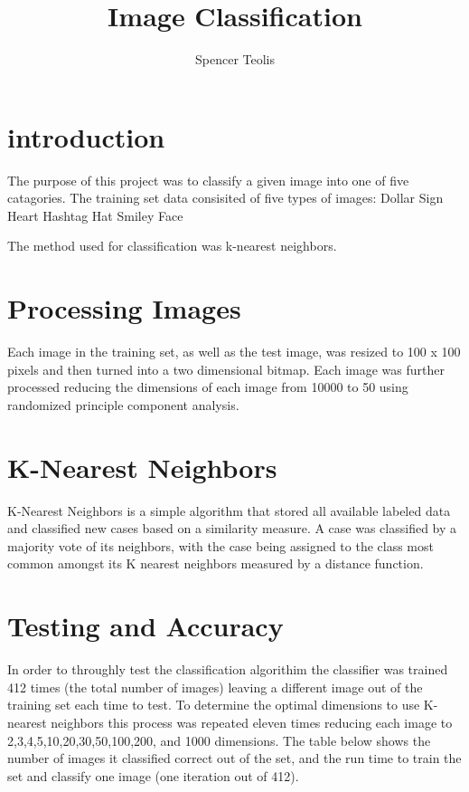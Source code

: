 \documentclass[12pt]{article}
\author{Spencer Teolis}
\title{Image Classification}
\date{}
\begin{document}
\begin{titlepage}
\maketitle
\end{titlepage}

\section{introduction}
The purpose of this project was to classify a given image into one of five catagories. The training set data consisited of five types of images:
Dollar Sign
Heart
Hashtag
Hat
Smiley Face

The method used for classification was k-nearest neighbors. 

\section{Processing Images}
Each image in the training set, as well as the test image, was resized to 100 x 100 pixels and then turned into a two dimensional bitmap. Each image was further processed reducing the dimensions of each image from 10000 to 50 using randomized principle component analysis.  

\section{K-Nearest Neighbors}
K-Nearest Neighbors is a simple algorithm that stored all available labeled data and classified new cases based on a similarity measure. A case was classified by a majority vote of its neighbors, with the case being assigned to the class most common amongst its K nearest neighbors measured by a distance function.

\section{Testing and Accuracy}
In order to throughly test the classification algorithim the classifier was trained 412 times (the total number of images) leaving a different image out of the training set each time to test. To determine the optimal dimensions to use K-nearest neighbors this process was repeated eleven times reducing each image to 2,3,4,5,10,20,30,50,100,200, and 1000 dimensions. The table below shows the number of images it classified correct out of the set, and the run time to train the set and classify one image (one iteration out of 412).
\end{document}
